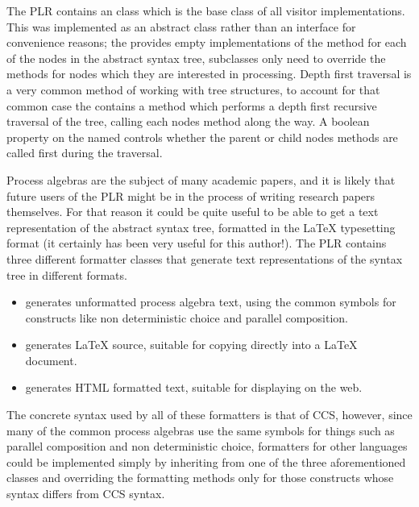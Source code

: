  The PLR contains an  class which is the base class
  of all visitor implementations. This was implemented as an abstract class
  rather than an interface for convenience reasons; the 
   provides empty implementations of the 
  method for each of the nodes in the abstract syntax tree, subclasses only
  need to override the  methods for nodes which they
  are interested in processing. Depth first traversal is a very common method
  of working with tree structures, to account for that common case the 
   contains a  
  method which performs a depth first recursive traversal of the tree, calling 
  each nodes  method along the way. A  boolean property on the 
   named  controls 
  whether the parent or child nodes  methods are called first 
  during the traversal.  
  
  Process algebras are the subject of many academic papers, and it is likely 
  that future users of the PLR might be in the process of writing research 
  papers themselves. For that reason it could be quite useful to be able to 
  get a text representation of the abstract syntax tree, formatted in the
  LaTeX typesetting format (it certainly has been very useful for this 
  author!). The PLR contains three different formatter classes that generate 
  text representations of the syntax tree in different formats. 
  
  \begin{itemize}
  	\item {} generates unformatted process algebra text, 
  	using the common symbols for constructs like non deterministic choice and 
  	parallel composition. 
  	
  	\item {} generates LaTeX source, suitable for copying 
  	directly into a LaTeX document.
  	
  	\item {} generates HTML formatted text, suitable for 
  	displaying on the web.
  \end{itemize}
  
  The concrete syntax used by all of these formatters is that of CCS, however, 
  since many of the common process algebras use the same symbols for things 
  such as parallel composition and non deterministic choice, formatters for 
  other languages could be implemented simply by inheriting from one of the 
  three aforementioned classes and overriding the formatting methods only for 
  those constructs whose syntax differs from CCS syntax.
  
